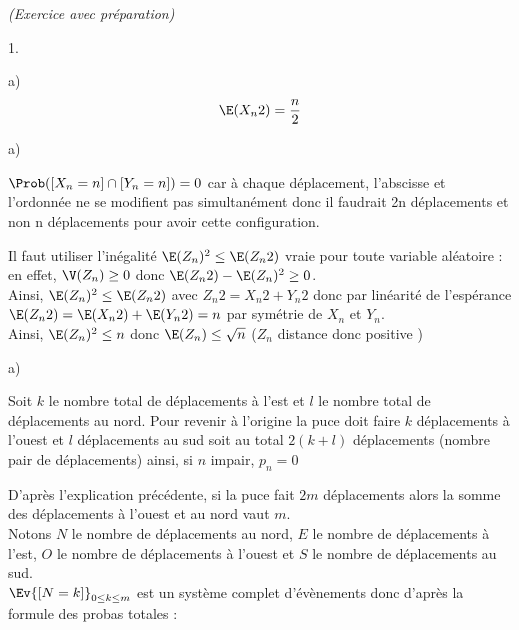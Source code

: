 \documentclass[11pt]{article}%
\begin{document}
\begin{exercice}{\it (Exercice avec préparation)}
\begin{noliste}{1.}
\begin{noliste}{a)}
\[
 \E(X_{n}{2}) = \frac{n}{2}
\]
 \end{noliste}
 \item \begin{noliste}{a)}
 \setlength{\itemsep}{2mm}
 \item $\Prob([X_{n} = n] \cap [Y_{n} = n]) = 0$ car à chaque
déplacement, l'abscisse et l'ordonnée ne se modifient pas simultanément
donc il faudrait 2n déplacements et non n déplacements pour avoir cette
configuration.
 \item Il faut utiliser l'inégalité $\E(Z_{n})^{2} \leq \E(Z_{n}{2})$
vraie pour toute variable aléatoire : en effet, $\V(Z_{n}) \geq 0 $
donc $\E(Z_{n}{2})-\E(Z_{n})^{2} \geq0$. \\
 Ainsi, $\E(Z_{n})^{2} \leq \E(Z_{n}{2})$ avec $Z_{n}{2} = X_{n}{2} +
Y_{n}{2}$ donc par linéarité de l'espérance $\E(Z_{n}{2}) =
\E(X_{n}{2}) + \E(Y_{n}{2}) = n$ par symétrie de $X_{n}$ et $Y_{n}$. \\
 Ainsi, $\E(Z_{n})^{2} \leq n $ donc $\E(Z_{n}) \leq \sqrt{n}$ ($Z_{n}$
distance donc positive )
 \end{noliste}
 \item \begin{noliste}{a)}
 \setlength{\itemsep}{2mm}
 \item Soit $k$ le nombre total de déplacements à l'est et $l$ le
nombre total de déplacements au nord. Pour revenir à l'origine la puce
doit faire $k$ déplacements à l'ouest et $l$ déplacements au sud soit
au total $2(k + l)$ déplacements (nombre pair de déplacements) ainsi,
si $n$ impair, $p_{n} = 0$ 
 \item D'après l'explication précédente, si la puce fait $2m$
déplacements alors la somme des déplacements à l'ouest et au nord vaut
$m$. \\
 Notons $N$ le nombre de déplacements au nord, $E$ le nombre de
déplacements à l'est, $O$ le nombre de déplacements à l'ouest et $S$ le
nombre de déplacements au sud.\\
 $\Ev{[N = k]}_{0 \leq k \leq m}$ est un système complet d'évènements
donc d'après la formule des probas totales : 
 

\end{noliste}
\end{noliste}
\end{exercice}
\end{document}
